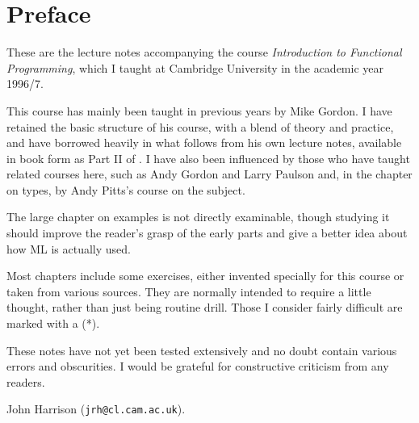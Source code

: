 \chapter*{Preface}

These are the lecture notes accompanying the course {\em Introduction to
Functional Programming}, which I taught at Cambridge University in the academic
year 1996/7.

This course has mainly been taught in previous years by Mike Gordon. I have
retained the basic structure of his course, with a blend of theory and
practice, and have borrowed heavily in what follows from his own lecture notes,
available in book form as Part II of \cite{gordon-plt}. I have also been
influenced by those who have taught related courses here, such as Andy Gordon
and Larry Paulson and, in the chapter on types, by Andy Pitts's course on the
subject.

The large chapter on examples is not directly examinable, though studying it 
should improve the reader's grasp of the early parts and give a better idea 
about how ML is actually used.

Most chapters include some exercises, either invented specially for this course
or taken from various sources. They are normally intended to require a little
thought, rather than just being routine drill. Those I consider fairly
difficult are marked with a (*).

These notes have not yet been tested extensively and no doubt contain various
errors and obscurities. I would be grateful for constructive criticism from any
readers.

\bigskip

John Harrison ({\tt jrh@cl.cam.ac.uk}).

